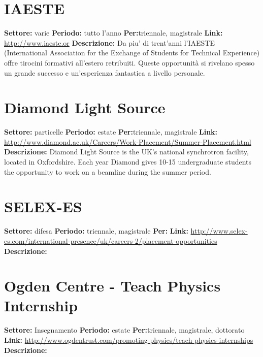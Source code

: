 \documentclass[a4paper,10pt]{article}
\begin{document}
{\section{ IAESTE   }
\textbf{Settore:} varie\newline
\textbf{Periodo:} tutto l'anno\newline
\textbf{Per:}triennale, magistrale\newline
\textbf{Link:} \url{http://www.iaeste.or} \newline
\textbf{Descrizione:} Da piu' di trent'anni l'IAESTE (International Association for the Exchange of Students for Technical Experience) offre tirocini formativi  all'estero retribuiti. Queste opportunità si rivelano spesso un grande successo e un'esperienza fantastica a livello personale.  

\section{ Diamond Light Source  }
\textbf{Settore:} particelle\newline
\textbf{Periodo:} estate\newline
\textbf{Per:}triennale, magistrale\newline
\textbf{Link:} \url{http://www.diamond.ac.uk/Careers/Work-Placement/Summer-Placement.html} \newline
\textbf{Descrizione:}   Diamond Light Source is the UK's national synchrotron facility, located in Oxfordshire. Each year Diamond gives 10-15 undergraduate students the opportunity to work on a beamline during the summer period.  

 \section{ SELEX-ES}
 \textbf{Settore:} difesa \newline
\textbf{Periodo:} triennale, magistrale\newline
\textbf{Per:}\newline
\textbf{Link:} \url{http://www.selex-es.com/international-presence/uk/careers-2/placement-opportunities} \newline
\textbf{Descrizione:} 

\section{ Ogden Centre - Teach Physics Internship }
\textbf{Settore:} Insegnamento\newline
\textbf{Periodo:} estate\newline
\textbf{Per:}triennale, magistrale, dottorato\newline
\textbf{Link:} \url{http://www.ogdentrust.com/promoting-physics/teach-physics-internships} \newline
\textbf{Descrizione:} 

}
\end{document}
